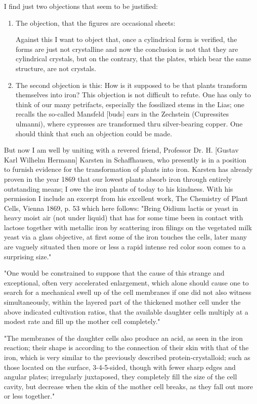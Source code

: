 \documentclass[a4paper, 11pt, oneside]{article}
\begin{document}
I find just two objections that seem to be justified:
\begin{enumerate}
    \item The objection, that the figures are occasional sheets:
    
    Against this I want to object that, once a cylindrical form is verified, the forms are just not crystalline and now the conclusion is not that they are cylindrical crystals, but on the contrary, that the plates, which bear the same structure, are not crystals.
    \item The second objection is this: How is it supposed to be that plants transform themselves into iron? This objection is not difficult to refute. One has only to think of our many petrifacts, especially the fossilized stems in the Lias; one recalls the so-called Mansfeld [buds] ears in the Zechstein (Cupressites ulmanni), where cypresses are transformed thru silver-bearing copper. One should think that such an objection could be made.
\end{enumerate}
But now I am well by uniting with a revered friend, Professor Dr. H. [Gustav Karl Wilhelm Hermann] Karsten in Schaffhausen, who presently is in a position to furnish evidence for the transformation of plants into iron. Karsten has already proven in the year 1869 that our lowest plants absorb iron through entirely outstanding means; I owe the iron plants of today to his kindness. With his permission I include an excerpt from his excellent work, The Chemistry of Plant Cells, Vienna 1869, p. 53 which here follows: "Bring Oidium lactis or yeast in heavy moist air (not under liquid) that has for some time been in contact with lactose together with metallic iron by scattering iron filings on the vegetated milk yeast via a glass objective, at first some of the iron touches the cells, later many are vaguely situated then more or less a rapid intense red color soon comes to a surprising size."

"One would be constrained to suppose that the cause of this strange and exceptional, often very accelerated enlargement, which alone should cause one to search for a mechanical swell up of the cell membranes if one did not also witness simultaneously, within the layered part of the thickened mother cell under the above indicated cultivation ratios, that the available daughter cells multiply at a modest rate and fill up the mother cell completely."

"The membranes of the daughter cells also produce an acid, as seen in the iron reaction; their shape is according to the connection of their skin with that of the iron, which is very similar to the previously described protein-crystalloid; such as those located on the surface, 3-4-5-sided, though with fewer sharp edges and angular plates; irregularly juxtaposed, they completely fill the size of the cell cavity, but decrease when the skin of the mother cell breaks, as they fall out more or less together."
\end{document}
